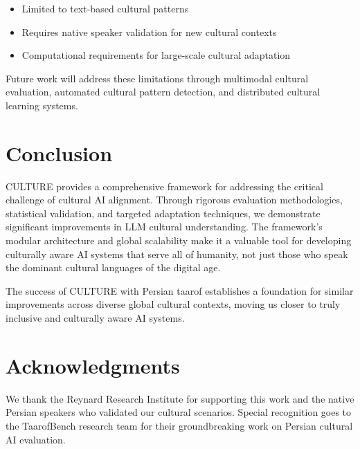 \documentclass[11pt,twocolumn]{article}
\begin{document}
\begin{itemize}
    \item Limited to text-based cultural patterns
    \item Requires native speaker validation for new cultural contexts
    \item Computational requirements for large-scale cultural adaptation
\end{itemize}

Future work will address these limitations through multimodal cultural evaluation, automated cultural pattern detection, and distributed cultural learning systems.

\section{Conclusion}

CULTURE provides a comprehensive framework for addressing the critical challenge of cultural AI alignment. Through rigorous evaluation methodologies, statistical validation, and targeted adaptation techniques, we demonstrate significant improvements in LLM cultural understanding. The framework's modular architecture and global scalability make it a valuable tool for developing culturally aware AI systems that serve all of humanity, not just those who speak the dominant cultural languages of the digital age.

The success of CULTURE with Persian taarof establishes a foundation for similar improvements across diverse global cultural contexts, moving us closer to truly inclusive and culturally aware AI systems.

\section*{Acknowledgments}

We thank the Reynard Research Institute for supporting this work and the native Persian speakers who validated our cultural scenarios. Special recognition goes to the TaarofBench research team for their groundbreaking work on Persian cultural AI evaluation.



\end{document}
